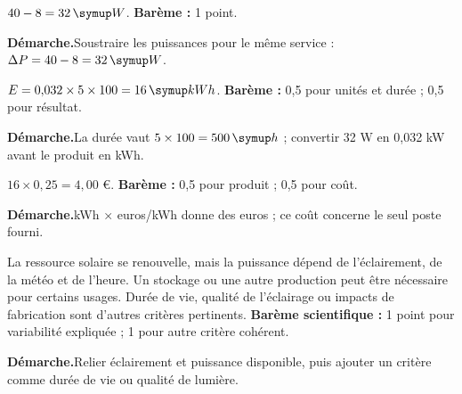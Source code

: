 \par\noindent\begin{minipage}{\linewidth}
$40-8=32\unite W$. \textbf{Barème :} 1 point.\par
\smallskip\noindent\textbf{Démarche.}\enspace Soustraire les puissances pour le même service : $\Delta P=40-8=32\unite W$.\par
\end{minipage}\par
\par\noindent\begin{minipage}{\linewidth}
$E=0{,}032\times5\times100=16\unite{kWh}$. \textbf{Barème :} 0,5 pour unités et durée ; 0,5 pour résultat.\par
\smallskip\noindent\textbf{Démarche.}\enspace La durée vaut $5\times100=500\unite h$ ; convertir 32 W en 0,032 kW avant le produit en kWh.\par
\end{minipage}\par
\par\noindent\begin{minipage}{\linewidth}
$16\times0{,}25=4{,}00$ €. \textbf{Barème :} 0,5 pour produit ; 0,5 pour coût.\par
\smallskip\noindent\textbf{Démarche.}\enspace kWh × euros/kWh donne des euros ; ce coût concerne le seul poste fourni.\par
{}
\end{minipage}\par
\par\noindent\begin{minipage}{\linewidth}
La ressource solaire se renouvelle, mais la puissance dépend de l’éclairement, de la météo et de l’heure. Un stockage ou une autre production peut être nécessaire pour certains usages. Durée de vie, qualité de l’éclairage ou impacts de fabrication sont d’autres critères pertinents. \textbf{Barème scientifique :} 1 point pour variabilité expliquée ; 1 pour autre critère cohérent.\par
\smallskip\noindent\textbf{Démarche.}\enspace Relier éclairement et puissance disponible, puis ajouter un critère comme durée de vie ou qualité de lumière.\par
\end{minipage}\par
